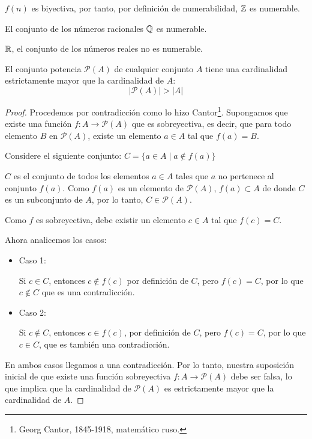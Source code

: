 \begin{fmd-proof}
	$f(n)$ es biyectiva, por tanto, por definición de numerabilidad, $\mathbb{Z}$ es numerable.
\end{fmd-proof}

\begin{theorem}[Numerabilidad de $\Q$]
	El conjunto de los números racionales $\Q$ es numerable.
\end{theorem}

\begin{theorem}[$\R$ no es numerable]
	$\R$, el conjunto de los números reales no es numerable.
\end{theorem}

\begin{fmd-theorem}  
	El conjunto potencia $\mathcal{P}(A)$ de cualquier conjunto $A$ tiene una cardinalidad estrictamente mayor que la cardinalidad de $A$:
	\[ |\mathcal{P}(A)| >  |A| \]
	
	\begin{proof}
		Procedemos por contradicción como lo hizo Cantor\footnote{Georg Cantor, 1845-1918, matemático ruso.}. Supongamos que existe una función $f: A \rightarrow \mathcal{P}(A)$ que es sobreyectiva, es decir, que para todo elemento $B$ en $\mathcal{P}(A)$, existe un elemento $a \in A$ tal que $f(a) = B$.
		
		Considere el siguiente conjunto: $ C = \{ a \in A \mid a \not \in f(a) \} $
		
		$C$ es el conjunto de todos los elementos $a \in A$ tales que $a$ no pertenece al conjunto $f(a)$.
		Como $f(a)$ es un elemento de $\mathcal{P}(A)$, $f(a) \subset A$ de donde $C$ es un subconjunto de $A$, por lo tanto, $C \in \mathcal{P}(A)$.
		
		Como $f$ es sobreyectiva, debe existir un elemento $c \in A$ tal que $f(c) = C$.
		
		Ahora analicemos los casos:
		
		\begin{itemize}
			\item Caso 1:
			
			 Si $c \in C$, entonces $c \not \in f(c)$ por definición de $C$, pero $f(c) = C$, por lo que $c \not \in C$ que es una contradicción.
			\item Caso 2:
			
			Si $c \not \in C$, entonces $c \in f(c)$, por definición de $C$, pero $f(c) = C$, por lo que $c \in C$, que es también una contradicción.
		\end{itemize}
		En ambos casos llegamos a una contradicción. Por lo tanto, nuestra suposición inicial de que existe una función sobreyectiva $f: A \rightarrow \mathcal{P}(A)$ debe ser falsa, lo que implica que la cardinalidad de $\mathcal{P}(A)$ es estrictamente mayor que la cardinalidad de $A$.
	\end{proof}
\end{fmd-theorem}

